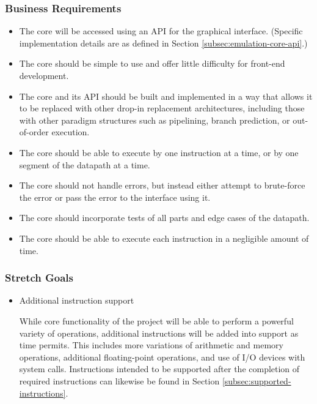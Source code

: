 \documentclass[
    paper=letter,
    parskip=half,
    fontsize=12pt,
    titlepage=firstiscover,
    toc=bibliography,
    numbers=endperiod
]{scrartcl}
\begin{document}
\subsubsection{Business Requirements}
\begin{itemize}
    \item The core will be accessed using an API for the graphical interface.
          (Specific implementation details are as defined in Section
          \ref{subsec:emulation-core-api}.)
    \item The core should be simple to use and offer little difficulty for
          front-end development.
    \item The core and its API should be built and implemented in a way that
          allows it to be replaced with other drop-in replacement architectures,
          including those with other paradigm structures such as pipelining,
          branch prediction, or out-of-order execution.
    \item The core should be able to execute by one instruction at a time, or by
          one segment of the datapath at a time.
    \item The core should not handle errors, but instead either attempt to
          brute-force the error or pass the error to the interface using it.
    \item The core should incorporate tests of all parts and edge cases of the
          datapath.
    \item The core should be able to execute each instruction in a negligible
          amount of time.
\end{itemize}

\subsubsection{Stretch Goals}
\begin{itemize}
    \item Additional instruction support

          While core functionality of the project will be able to perform a
          powerful variety of operations, additional instructions will be added
          into support as time permits. This includes more variations of
          arithmetic and memory operations, additional floating-point operations,
          and use of I/O devices with system calls. Instructions intended to be
          supported after the completion of required instructions can likewise be
          found in Section \ref{subsec:supported-instructions}.
\end{itemize}
\end{document}
